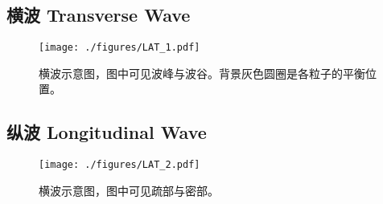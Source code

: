 
\subsection{横波 Transverse Wave}
\begin{figure}[ht]
\centering
\texttt{[image: ./figures/LAT\_1.pdf]}
\caption{横波示意图，图中可见波峰与波谷。背景灰色圆圈是各粒子的平衡位置。} \label{LAT_fig1}
\end{figure}


\subsection{纵波 Longitudinal Wave}
\begin{figure}[ht]
\centering
\texttt{[image: ./figures/LAT\_2.pdf]}
\caption{横波示意图，图中可见疏部与密部。} \label{LAT_fig2}
\end{figure}